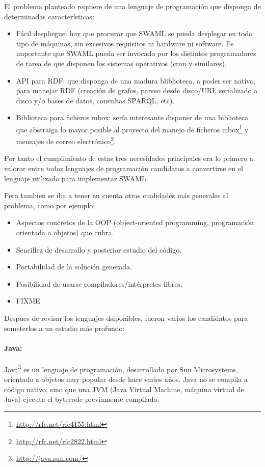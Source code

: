 El problema planteado requiere de una lenguaje de programación que disponga
de determinadas características:

\begin{itemize}
  \item Fácil despliegue: hay que procurar que SWAML se pueda desplegar en
	todo tipo de máquinas, sin excesivos requisitos ni hardware ni software.
	Es importante que SWAML pueda ser invocado por los distintos programadores
	de tarea de que disponen los sistemas operativos (cron y similares).
  \item API para RDF: que disponga de una madura bliblioteca, a poder ser nativa, 
	para manejar RDF (creación de grafos, parseo desde disco/URI, serializado
	a disco y/o bases de datos, consultas SPARQL, etc).
  \item Biblioteca para ficheros mbox: sería interesante disponer de una biblioteca 
	que abstraiga lo mayor posible al proyecto del manejo de ficheros
	mbox\footnote{\url{http://rfc.net/rfc4155.html}} y mensajes de correo 
	electrónico\footnote{\url{http://rfc.net/rfc2822.html}}.
\end{itemize}

Por tanto el cumplimiento de estas tres necesidades principales era lo primero
a valorar entre todos lenguajes de programación candidatos a convertirse en el
lenguaje utilizado para implementar SWAML. 

Pero tambien se iba a tener en cuenta otras cualidades más generales al problema,
como por ejemplo:

\begin{itemize}
  \item Aspectos concretos de la OOP (object-oriented programming, programación 
	orientada a objetos) que cubra.
  \item Sencillez de desarrollo y posterior estudio del código.
  \item Portabilidad de la solución generada.
  \item Posibilidad de usarse compiladores/intérpretes libres.
  \item FIXME
\end{itemize}

Despues de revisar los lenguajes dsiponibles, fueron varios los candidatos para
someterlos a un estudio más profundo:

\paragraph{Java:}Java\footnote{\url{http://java.sun.com/}}
es un lenguaje de programación, desarrollado por Sun Microsystems, orientado a 
objetos muy popular desde hace varios años. Java no se compila a código nativo, 
sino que una JVM (Java Virtual Machine, máquina virtual de Java) ejecuta el 
bytecode previamente compilado.

